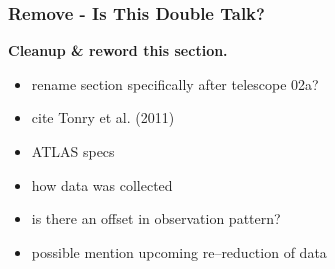 \documentclass[aps,prb,twocolumn,superscriptaddress]{revtex4-1}
\begin{document}
\subsubsection{Remove - Is This Double Talk?}
{\bf Cleanup \& reword this section.\\}

\begin{itemize}
	\item{} rename section specifically after telescope 02a?
	\item{} cite Tonry et al. (2011)~\cite{ATLAS_data}
	\item{} ATLAS specs~\cite{ATLAS_data}
	\item{} how data was collected
	\item{} is there an offset in observation pattern?
	\item{} possible mention upcoming re--reduction of data
\end{itemize}
\end{document}
